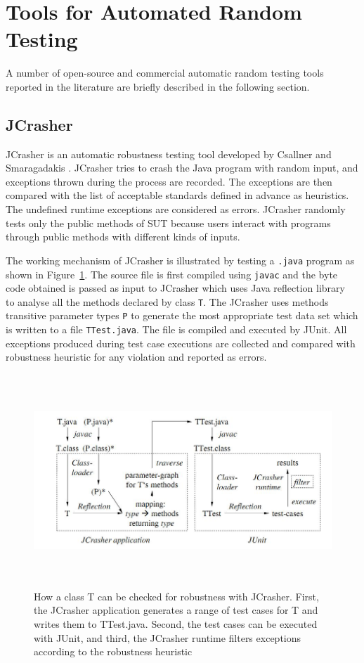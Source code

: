 \section{Tools for Automated Random Testing}
A number of open-source and commercial automatic random testing tools reported in the literature are briefly described in the following section.


\subsection{JCrasher}
JCrasher is an automatic robustness testing tool developed by Csallner and Smaragadakis \cite{csallner2004jcrasher}. JCrasher tries to crash the Java program with random input, and exceptions thrown during the process are recorded. The exceptions are then compared with the list of acceptable standards defined in advance as heuristics. The undefined runtime exceptions are considered as errors. JCrasher randomly tests only the public methods of SUT because users interact with programs through public methods with different kinds of inputs.

The working mechanism of JCrasher is illustrated by testing a \verb+.java+ program as shown in Figure~\ref{fig:JCrasher}. The source file is first compiled using \verb+javac+ and the byte code obtained is passed as input to JCrasher which uses Java reflection library~\cite{chan1999java} to analyse all the methods declared by class \verb+T+. The JCrasher uses methods transitive parameter types \verb+P+ to generate the most appropriate test data set which is written to a file \verb+TTest.java+. The file is compiled and executed by JUnit. All exceptions produced during test case executions are collected and compared with robustness heuristic for any violation and reported as errors.

\begin{figure}[h]
	\centering
	\includegraphics[width=15cm, height=8cm]{chapter2/JCrasher.png}
	\caption{How a class T can be checked for robustness with JCrasher. First, the JCrasher application generates a range of test cases for T and writes them to TTest.java. Second, the test cases can be executed with JUnit, and third, the JCrasher runtime filters exceptions according to the robustness heuristic~\cite{csallner2004jcrasher}}
	\label{fig:JCrasher}
\end{figure}

